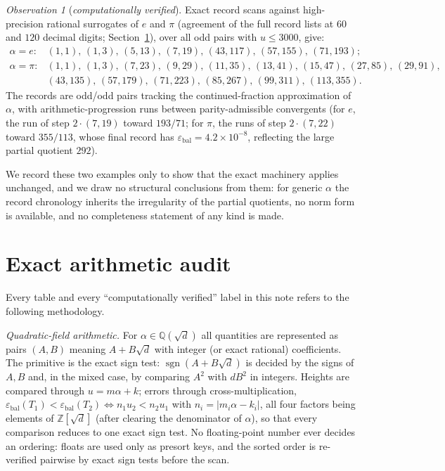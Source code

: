 \documentclass[11pt]{article}
\theoremstyle{definition}
\theoremstyle{remark}
\newtheorem{observation}[theorem]{Observation}
\newcommand{\eb}{\varepsilon_{\mathrm{bal}}}
\newcommand{\ZZ}{\mathbb{Z}}
\newcommand{\QQ}{\mathbb{Q}}
\begin{document}
\begin{observation}[\emph{computationally verified}]\label{obs:epi}
Exact record scans against high-precision rational surrogates of $e$ and $\pi$ (agreement of the full record lists at $60$ and $120$ decimal digits; Section~\ref{sec:audit}), over all odd pairs with $u\le3000$, give:
\[
\begin{array}{ll}
\alpha=e: & (1,1),\,(1,3),\,(5,13),\,(7,19),\,(43,117),\,(57,155),\,(71,193);\\[2pt]
\alpha=\pi: & (1,1),\,(1,3),\,(7,23),\,(9,29),\,(11,35),\,(13,41),\,(15,47),\,(27,85),\,(29,91),\\
& (43,135),\,(57,179),\,(71,223),\,(85,267),\,(99,311),\,(113,355).
\end{array}
\]
The records are odd/odd pairs tracking the continued-fraction approximation of $\alpha$, with arithmetic-progression runs between parity-admissible convergents (for $e$, the run of step $2\cdot(7,19)$ toward $193/71$; for $\pi$, the runs of step $2\cdot(7,22)$ toward $355/113$, whose final record has $\eb=4.2\times10^{-8}$, reflecting the large partial quotient $292$).
\end{observation}

We record these two examples only to show that the exact machinery applies unchanged, and we draw no structural conclusions from them: for generic $\alpha$ the record chronology inherits the irregularity of the partial quotients, no norm form is available, and no completeness statement of any kind is made.

\section{Exact arithmetic audit}\label{sec:audit}

Every table and every ``computationally verified'' label in this note refers to the following methodology.

\emph{Quadratic-field arithmetic.} For $\alpha\in\QQ(\sqrt d)$ all quantities are represented as pairs $(A,B)$ meaning $A+B\sqrt d$ with integer (or exact rational) coefficients. The primitive is the exact sign test: $\operatorname{sgn}(A+B\sqrt d)$ is decided by the signs of $A,B$ and, in the mixed case, by comparing $A^2$ with $dB^2$ in integers. Heights are compared through $u=m\alpha+k$; errors through cross-multiplication, $\eb(T_1)<\eb(T_2)\iff n_1u_2<n_2u_1$ with $n_i=|m_i\alpha-k_i|$, all four factors being elements of $\ZZ[\sqrt d]$ (after clearing the denominator of $\alpha$), so that every comparison reduces to one exact sign test. No floating-point number ever decides an ordering: floats are used only as presort keys, and the sorted order is re-verified pairwise by exact sign tests before the scan.
\end{document}
